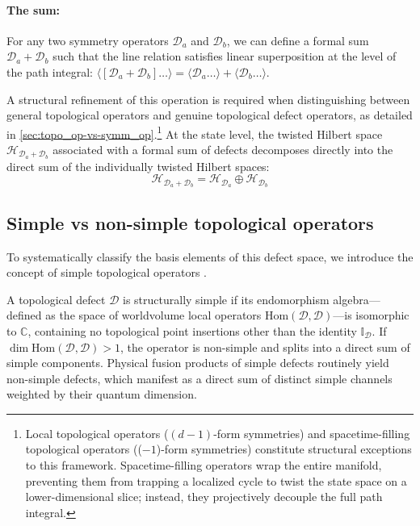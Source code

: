 \documentclass[aps,preprint,nofootinbib,preprintnumbers,eqsecnum,superscriptaddress]{revtex4}
\numberwithin{equation}{section}
\begin{document}
\paragraph{The sum:}
For any two symmetry operators $\mathcal{D}_a$ and $\mathcal{D}_b$, we can define a formal sum $\mathcal{D}_a + \mathcal{D}_b$ such that the line relation satisfies linear superposition at the level of the path integral: $\langle [\mathcal{D}_a + \mathcal{D}_b] \dots \rangle = \langle \mathcal{D}_a \dots \rangle + \langle \mathcal{D}_b \dots \rangle$.

A structural refinement of this operation is required when distinguishing between general topological operators and genuine topological defect operators, as detailed in \ref{sec:topo_op-vs-symm_op}.\footnote{Local topological operators ($(d-1)$-form symmetries) and spacetime-filling topological operators (($-1$)-form symmetries) constitute structural exceptions to this framework. Spacetime-filling operators wrap the entire manifold, preventing them from trapping a localized cycle to twist the state space on a lower-dimensional slice; instead, they projectively decouple the full path integral.} At the state level, the twisted Hilbert space $\mathcal{H}_{\mathcal{D}_a + \mathcal{D}_b}$ associated with a formal sum of defects decomposes directly into the direct sum of the individually twisted Hilbert spaces:
\begin{equation}
    \mathcal{H}_{\mathcal{D}_a + \mathcal{D}_b} = \mathcal{H}_{\mathcal{D}_a} \oplus \mathcal{H}_{\mathcal{D}_b}
\end{equation}

\subsection{Simple vs non-simple topological operators} \label{sec:simple_topo_op}

To systematically classify the basis elements of this defect space, we introduce the concept of simple topological operators \cite{shao2024whatsundonetasilectures, schafernameki2023ictplecturesnoninvertiblegeneralized}.

A topological defect $\mathcal{D}$ is structurally simple if its endomorphism algebra—defined as the space of worldvolume local operators $\text{Hom}(\mathcal{D}, \mathcal{D})$—is isomorphic to $\mathbb{C}$, containing no topological point insertions other than the identity $\mathbb{I}_{\mathcal{D}}$. If $\dim \text{Hom}(\mathcal{D}, \mathcal{D}) > 1$, the operator is non-simple and splits into a direct sum of simple components. Physical fusion products of simple defects routinely yield non-simple defects, which manifest as a direct sum of distinct simple channels weighted by their quantum dimension.
\end{document}
